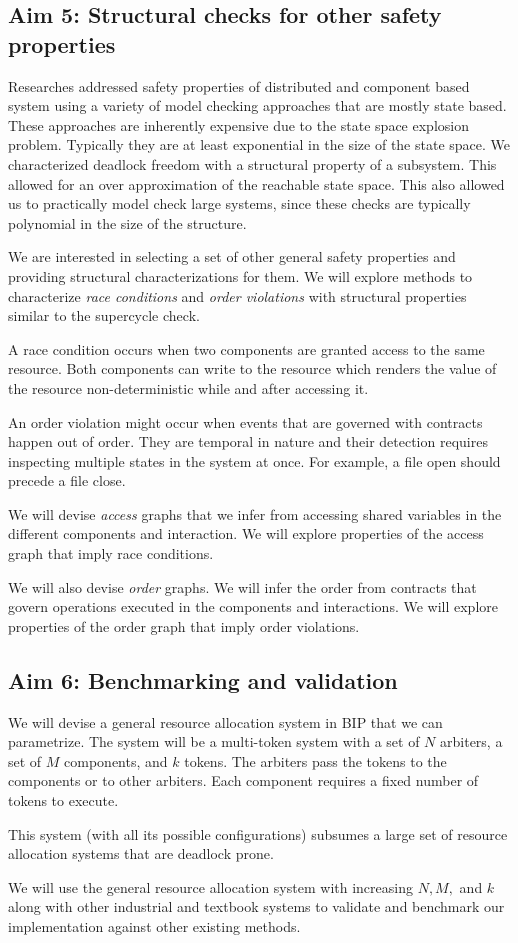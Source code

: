 \subsection{Aim 5: Structural checks for other safety properties} 

Researches addressed safety properties of distributed and 
component based system using a variety of model checking
approaches that are mostly state based. 
These approaches are inherently expensive due to the state
space explosion problem. 
Typically they are at least exponential in the size of the 
state space. 
%
We characterized deadlock freedom with a structural property 
of a subsystem. 
This allowed for an over approximation of the reachable state
space. 
This also allowed us to practically model check 
large systems,
since these checks are typically polynomial in the size 
of the structure. 

We are interested in selecting a set of other general safety
properties and providing structural characterizations 
for them.
We will explore methods to characterize {\em race conditions}
and {\em order violations} with structural properties
similar to the supercycle check.

A race condition occurs when two components are granted access
to the same resource. Both components can write to the resource
which renders the value of the resource non-deterministic while
and after accessing it. 

An order violation might occur when events that are governed 
with contracts happen out of order.
They are temporal in nature and their detection requires
inspecting multiple states in the system at once. 
For example, a file open should precede a file close. 

We will devise {\em access} graphs that we infer from 
accessing shared variables in the different components 
and interaction.
We will explore properties of the access graph that 
imply race conditions. 

We will also devise {\em order} graphs. 
We will infer the order from contracts that 
govern operations executed in the components
and interactions. 
We will explore properties of the order graph that 
imply order violations.  

\subsection{Aim 6: Benchmarking and validation } 
 
 We will devise a general resource allocation system
 in BIP  that we can parametrize.
 The system will be a multi-token system 
 with a set of $N$ arbiters, a set of $M$ components,
 and $k$ tokens. 
 The arbiters pass the tokens to the components or to other
 arbiters. 
 Each component requires a fixed number of tokens to 
 execute. 

 This system (with all its possible configurations)
 subsumes a large set of resource allocation
 systems that are deadlock prone. 

 We will use the general resource allocation system 
 with increasing $N, M,$ and $k$ 
 along with other industrial and textbook systems
 to validate and benchmark our implementation
 against other existing methods. 

